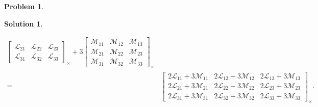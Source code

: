 \documentclass{book}
\theoremstyle{definition}
\newtheorem*{prob*}{Problem}
\newtheorem*{sln*}{Solution}
\newcommand{\lag}{\mathcal{L}}
\newcommand{\M}{\mathcal{M}}
\begin{document}
\begin{prob*}
\begin{sln*}
\begin{enumerate}
\begin{enumerate}
\begin{align*}
\begin{bmatrix}
			\lag_{21} & \lag_{22} & \lag_{23}\\
			\lag_{31} & \lag_{32} & \lag_{33}
			\end{bmatrix}_\times 
			+ 
			3\begin{bmatrix}
			\M_{11} & \M_{12} & \M_{13}\\
			\M_{21} & \M_{22} & \M_{23}\\
			\M_{31} & \M_{32} & \M_{33}
			\end{bmatrix}_\times\\
			=
			& \begin{bmatrix}
			2\lag_{11} + 3\M_{11} & 2\lag_{12} + 3\M_{12} & 2\lag_{13} + 3\M_{13}\\
			2\lag_{21} + 3\M_{21} & 2\lag_{22} + 3\M_{22} & 2\lag_{23} + 3\M_{23}\\
			2\lag_{31} + 3\M_{31} & 2\lag_{32} + 3\M_{32} & 2\lag_{33} + 3\M_{33}
			\end{bmatrix}_\times.
			\end{align*}
			
			
			
			
			
			
			
			
			
			
			
			
			
			
			
			
			
			\newpage
			

\end{enumerate}
\end{enumerate}
\end{sln*}
\end{prob*}
\end{document}
